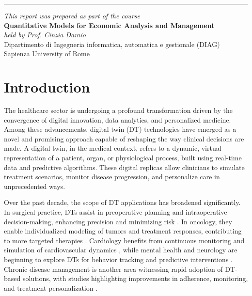 \documentclass[10pt,a4paper]{article}
\begin{document}
\vspace{1em}
\hrule
\vspace{2em}

\vspace*{\fill}
{\small
\begin{flushleft}
\textit{This report was prepared as part of the course}\\
\textbf{Quantitative Models for Economic Analysis and Management}\\
\textit{held by Prof. Cinzia Daraio}\\
Dipartimento di Ingegneria informatica, automatica e gestionale (DIAG)\\
Sapienza University of Rome
\end{flushleft}
}

\newpage

\section{Introduction}

The healthcare sector is undergoing a profound transformation driven by the convergence of digital innovation, data analytics, and personalized medicine. Among these advancements, digital twin (DT) technologies have emerged as a novel and promising approach capable of reshaping the way clinical decisions are made. A digital twin, in the medical context, refers to a dynamic, virtual representation of a patient, organ, or physiological process, built using real-time data and predictive algorithms. These digital replicas allow clinicians to simulate treatment scenarios, monitor disease progression, and personalize care in unprecedented ways.

Over the past decade, the scope of DT applications has broadened significantly. In surgical practice, DTs assist in preoperative planning and intraoperative decision-making, enhancing precision and minimizing risk \cite{bjelland2022, Liang2024}. In oncology, they enable individualized modeling of tumors and treatment responses, contributing to more targeted therapies \cite{wu2022, Puranik2022, Cellina2023}. Cardiology benefits from continuous monitoring and simulation of cardiovascular dynamics \cite{Ali2023, Lu2023}, while mental health and neurology are beginning to explore DTs for behavior tracking and predictive interventions \cite{Abilkaiyrkyzy2024, Subramanian2022b, Fekonja2024}. Chronic disease management is another area witnessing rapid adoption of DT-based solutions, with studies highlighting improvements in adherence, monitoring, and treatment personalization \cite{Stephanie2024, Venkatesh2024}.
\end{document}
